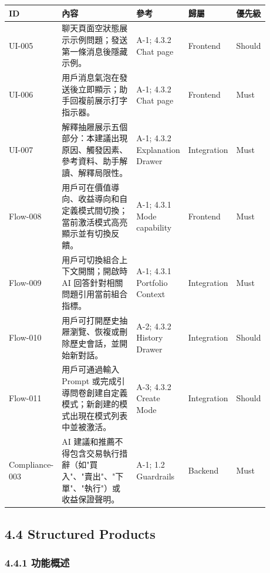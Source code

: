 \begingroup
\small
\begin{longtable}{L{0.18\linewidth}L{0.30\linewidth}L{0.18\linewidth}L{0.12\linewidth}L{0.10\linewidth}}
\toprule
\textbf{ID} & \textbf{內容} & \textbf{參考} & \textbf{歸屬} & \textbf{優先級} \\
\midrule
UI-005 & 聊天頁面空狀態展示示例問題；發送第一條消息後隱藏示例。 & A-1; 4.3.2 Chat page & Frontend & Should \\
UI-006 & 用戶消息氣泡在發送後立即顯示；助手回複前展示打字指示器。 & A-1; 4.3.2 Chat page & Frontend & Must \\
UI-007 & 解釋抽屜展示五個部分：本建議出現原因、觸發因素、參考資料、助手解讀、解釋局限性。 & A-1; 4.3.2 Explanation Drawer & Integration & Must \\
Flow-008 & 用戶可在價值導向、收益導向和自定義模式間切換；當前激活模式高亮顯示並有切換反饋。 & A-1; 4.3.1 Mode capability & Frontend & Must \\
Flow-009 & 用戶可切換組合上下文開關；開啟時 AI 回答針對相關問題引用當前組合指標。 & A-1; 4.3.1 Portfolio Context & Integration & Must \\
Flow-010 & 用戶可打開歷史抽屜瀏覽、恢複或刪除歷史會話，並開始新對話。 & A-2; 4.3.2 History Drawer & Integration & Should \\
Flow-011 & 用戶可通過輸入 Prompt 或完成引導問卷創建自定義模式；新創建的模式出現在模式列表中並被激活。 & A-3; 4.3.2 Create Mode & Integration & Should \\
Compliance-003 & AI 建議和推薦不得包含交易執行措辭（如"買入"、"賣出"、"下單"、"執行"）或收益保證聲明。 & A-1; 1.2 Guardrails & Backend & Must \\
\bottomrule
\end{longtable}
\endgroup

\subsection{4.4 Structured Products}

\subsubsection{4.4.1 功能概述}


